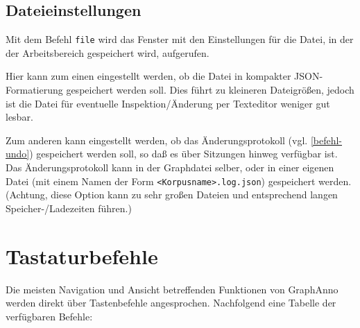 \documentclass[12pt]{scrartcl}
\begin{document}
\subsection{Dateieinstellungen}

Mit dem Befehl \texttt{file} wird das Fenster mit den Einstellungen für die Datei, in der der Arbeitsbereich gespeichert wird, aufgerufen.

Hier kann zum einen eingestellt werden, ob die Datei in kompakter JSON-Formatierung gespeichert werden soll.
Dies führt zu kleineren Dateigrößen, jedoch ist die Datei für eventuelle Inspektion/Änderung per Texteditor weniger gut lesbar.

Zum anderen kann eingestellt werden, ob das Änderungsprotokoll (vgl. \ref{befehl-undo}) gespeichert werden soll, so daß es über Sitzungen hinweg verfügbar ist.
Das Änderungsprotokoll kann in der Graphdatei selber, oder in einer eigenen Datei (mit einem Namen der Form \texttt{<Korpusname>.log.json}) gespeichert werden.
(Achtung, diese Option kann zu sehr großen Dateien und entsprechend langen Speicher-/Ladezeiten führen.)


\section{Tastaturbefehle}

Die meisten Navigation und Ansicht betreffenden Funktionen von GraphAnno werden direkt über Tastenbefehle angesprochen. Nachfolgend eine Tabelle der verfügbaren Befehle:
\end{document}
